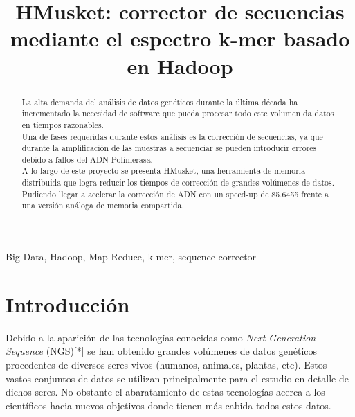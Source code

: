 \documentclass[conference]{IEEEtran}
\begin{document}
\title{HMusket: corrector de secuencias mediante el espectro k-mer basado en Hadoop}

\author{
\and
{}
\and
{}
}

\maketitle

\begin{abstract}
La alta demanda del análisis de datos genéticos durante la última década ha incrementado la necesidad de software que pueda procesar todo este volumen da datos en tiempos razonables.\\
Una de fases requeridas durante estos análisis es la corrección de secuencias, ya que durante la amplificación de las muestras a secuenciar se pueden introducir errores debido a fallos del ADN Polimerasa.\\
A lo largo de este proyecto se presenta HMusket, una herramienta de memoria distribuida que logra reducir los tiempos de corrección de grandes volúmenes de datos. Pudiendo llegar a acelerar la corrección de ADN con un speed-up de 85.6455 frente a una versión análoga de memoria compartida.
\end{abstract}

\begin{IEEEkeywords}
Big Data, Hadoop, Map-Reduce, k-mer, sequence corrector
\end{IEEEkeywords}

\section{Introducción}
Debido a la aparición de las tecnologías conocidas como \textit{Next Generation Sequence} (NGS)[*] se han obtenido grandes volúmenes de datos genéticos procedentes de diversos seres vivos (humanos, animales, plantas, etc). Estos vastos conjuntos de datos se utilizan principalmente para el estudio en detalle de dichos seres. 
No obstante el abaratamiento de estas tecnologías acerca a los científicos hacia nuevos objetivos donde tienen más cabida todos estos datos.
\\
\end{document}
